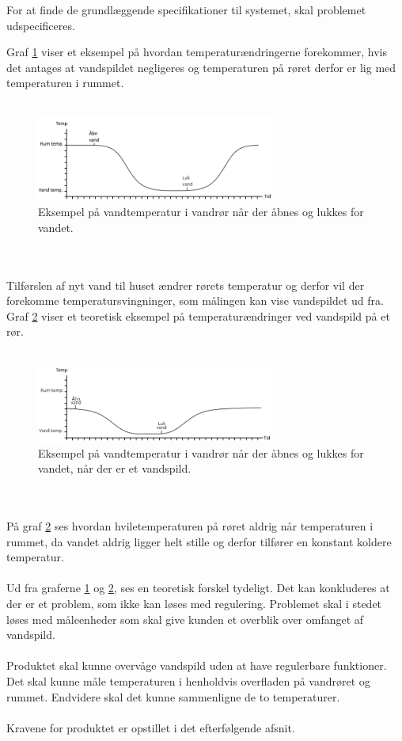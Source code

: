 For at finde de grundlæggende specifikationer til systemet, skal problemet udspecificeres.  

Graf \ref{vandspild_graf_normal} viser et eksempel på hvordan temperaturændringerne forekommer, hvis det antages at vandspildet negligeres og temperaturen på røret derfor er lig med temperaturen i rummet. 
\\
\\
\begin{figure}[h!]
  \centering
  \includegraphics[width=0.7\textwidth]{figures/vandspild_graf_normal.png}
  \caption{Eksempel på vandtemperatur i vandrør når der åbnes og lukkes for vandet.}
  \label{vandspild_graf_normal}
\end{figure}
\\
\\
Tilførslen af nyt vand til huset ændrer rørets temperatur og derfor vil der forekomme temperatursvingninger, som målingen kan vise vandspildet ud fra. Graf \ref{vandspild_graf_spild} viser et teoretisk eksempel på temperaturændringer ved vandspild på et rør.
\\
\\
\begin{figure}[h!]
  \centering
  \includegraphics[width=0.7\textwidth]{figures/vandspild_graf_spild.png}
  \caption{Eksempel på vandtemperatur i vandrør når der åbnes og lukkes for vandet, når der er et vandspild.}
  \label{vandspild_graf_spild}
\end{figure}
\\
\\
På graf \ref{vandspild_graf_spild} ses hvordan hviletemperaturen på røret aldrig når temperaturen i rummet, da vandet aldrig ligger helt stille og derfor tilfører en konstant koldere temperatur.
\\
\\
Ud fra graferne \ref{vandspild_graf_normal} og \ref{vandspild_graf_spild}, ses en teoretisk forskel tydeligt. Det kan konkluderes at der er et problem, som ikke kan løses med regulering. Problemet skal i stedet løses med måleenheder som skal give kunden et overblik over omfanget af vandspild.
\\
\\
Produktet skal kunne overvåge vandspild uden at have regulerbare funktioner. Det skal kunne måle temperaturen i henholdvis overfladen på vandrøret og rummet. Endvidere skal det kunne sammenligne de to temperaturer.
\\
\\
Kravene for produktet er opstillet i det efterfølgende afsnit.     